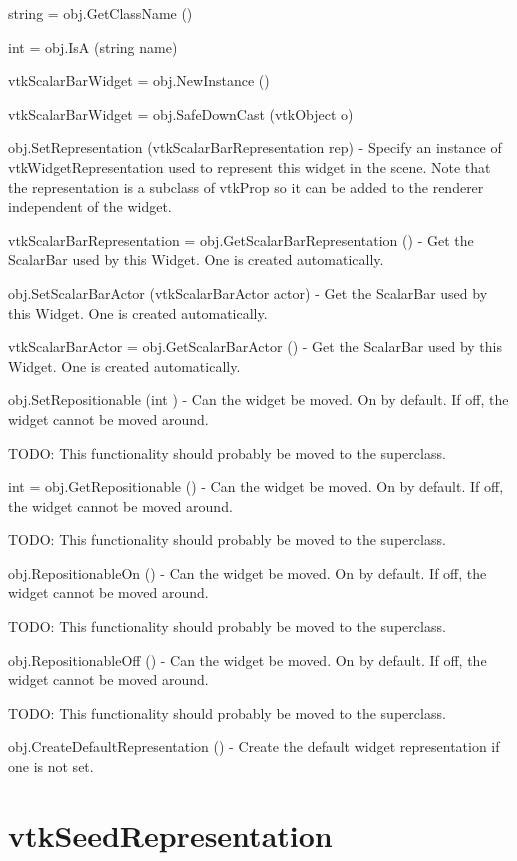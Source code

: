 \begin{DoxyItemize}
\item {\ttfamily string = obj.\-Get\-Class\-Name ()}  
\item {\ttfamily int = obj.\-Is\-A (string name)}  
\item {\ttfamily vtk\-Scalar\-Bar\-Widget = obj.\-New\-Instance ()}  
\item {\ttfamily vtk\-Scalar\-Bar\-Widget = obj.\-Safe\-Down\-Cast (vtk\-Object o)}  
\item {\ttfamily obj.\-Set\-Representation (vtk\-Scalar\-Bar\-Representation rep)} -\/ Specify an instance of vtk\-Widget\-Representation used to represent this widget in the scene. Note that the representation is a subclass of vtk\-Prop so it can be added to the renderer independent of the widget.  
\item {\ttfamily vtk\-Scalar\-Bar\-Representation = obj.\-Get\-Scalar\-Bar\-Representation ()} -\/ Get the Scalar\-Bar used by this Widget. One is created automatically.  
\item {\ttfamily obj.\-Set\-Scalar\-Bar\-Actor (vtk\-Scalar\-Bar\-Actor actor)} -\/ Get the Scalar\-Bar used by this Widget. One is created automatically.  
\item {\ttfamily vtk\-Scalar\-Bar\-Actor = obj.\-Get\-Scalar\-Bar\-Actor ()} -\/ Get the Scalar\-Bar used by this Widget. One is created automatically.  
\item {\ttfamily obj.\-Set\-Repositionable (int )} -\/ Can the widget be moved. On by default. If off, the widget cannot be moved around.

T\-O\-D\-O\-: This functionality should probably be moved to the superclass.  
\item {\ttfamily int = obj.\-Get\-Repositionable ()} -\/ Can the widget be moved. On by default. If off, the widget cannot be moved around.

T\-O\-D\-O\-: This functionality should probably be moved to the superclass.  
\item {\ttfamily obj.\-Repositionable\-On ()} -\/ Can the widget be moved. On by default. If off, the widget cannot be moved around.

T\-O\-D\-O\-: This functionality should probably be moved to the superclass.  
\item {\ttfamily obj.\-Repositionable\-Off ()} -\/ Can the widget be moved. On by default. If off, the widget cannot be moved around.

T\-O\-D\-O\-: This functionality should probably be moved to the superclass.  
\item {\ttfamily obj.\-Create\-Default\-Representation ()} -\/ Create the default widget representation if one is not set.  
\end{DoxyItemize}\hypertarget{vtkwidgets_vtkseedrepresentation}{}\section{vtk\-Seed\-Representation}\label{vtkwidgets_vtkseedrepresentation}
